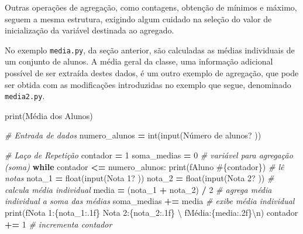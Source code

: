 \documentclass[
]{book}
\newenvironment{Shaded}{\begin{snugshade}}{\end{snugshade}}
\newcommand{\BuiltInTok}[1]{#1}
\newcommand{\CharTok}[1]{\textcolor[rgb]{0.31,0.60,0.02}{#1}}
\newcommand{\CommentTok}[1]{\textcolor[rgb]{0.56,0.35,0.01}{\textit{#1}}}
\newcommand{\ControlFlowTok}[1]{\textcolor[rgb]{0.13,0.29,0.53}{\textbf{#1}}}
\newcommand{\DecValTok}[1]{\textcolor[rgb]{0.00,0.00,0.81}{#1}}
\newcommand{\NormalTok}[1]{#1}
\newcommand{\OperatorTok}[1]{\textcolor[rgb]{0.81,0.36,0.00}{\textbf{#1}}}
\newcommand{\SpecialCharTok}[1]{\textcolor[rgb]{0.00,0.00,0.00}{#1}}
\newcommand{\SpecialStringTok}[1]{\textcolor[rgb]{0.31,0.60,0.02}{#1}}
\newcommand{\StringTok}[1]{\textcolor[rgb]{0.31,0.60,0.02}{#1}}
\begin{document}
Outras operações de agregação, como contagens, obtenção de mínimos e máximo, seguem a mesma estrutura, exigindo algum cuidado na seleção do valor de inicialização da variável destinada ao agregado.

No exemplo \texttt{media.py}, da seção anterior, são calculadas as médias individuais de um conjunto de alunos. A média geral da classe, uma informação adicional possível de ser extraída destes dados, é um outro exemplo de agregação, que pode ser obtida com as modificações introduzidas no exemplo que segue, denominado \texttt{media2.py}.

\begin{Shaded}
\begin{Highlighting}[]
\BuiltInTok{print}\NormalTok{(}\StringTok{\textquotesingle{}Média dos Alunos\textquotesingle{}}\NormalTok{)}

\CommentTok{\# Entrada de dados}
\NormalTok{numero\_alunos }\OperatorTok{=} \BuiltInTok{int}\NormalTok{(}\BuiltInTok{input}\NormalTok{(}\StringTok{\textquotesingle{}Número de alunos? \textquotesingle{}}\NormalTok{))}

\CommentTok{\# Laço de Repetição}
\NormalTok{contador }\OperatorTok{=} \DecValTok{1}
\NormalTok{soma\_medias }\OperatorTok{=} \DecValTok{0} \CommentTok{\# variável para agregação (soma)}
\ControlFlowTok{while}\NormalTok{ contador }\OperatorTok{\textless{}=}\NormalTok{ numero\_alunos:}
    \BuiltInTok{print}\NormalTok{(}\SpecialStringTok{f\textquotesingle{}Aluno \#}\SpecialCharTok{\{}\NormalTok{contador}\SpecialCharTok{\}}\SpecialStringTok{\textquotesingle{}}\NormalTok{)}
    \CommentTok{\# lê notas}
\NormalTok{    nota\_1 }\OperatorTok{=} \BuiltInTok{float}\NormalTok{(}\BuiltInTok{input}\NormalTok{(}\StringTok{\textquotesingle{}Nota 1? \textquotesingle{}}\NormalTok{))}
\NormalTok{    nota\_2 }\OperatorTok{=} \BuiltInTok{float}\NormalTok{(}\BuiltInTok{input}\NormalTok{(}\StringTok{\textquotesingle{}Nota 2? \textquotesingle{}}\NormalTok{))}
    \CommentTok{\# calcula média individual}
\NormalTok{    media }\OperatorTok{=}\NormalTok{ (nota\_1 }\OperatorTok{+}\NormalTok{ nota\_2) }\OperatorTok{/} \DecValTok{2}
    \CommentTok{\# agrega média individual a soma das médias}
\NormalTok{    soma\_medias }\OperatorTok{+=}\NormalTok{ media}
    \CommentTok{\# exibe média individual}
    \BuiltInTok{print}\NormalTok{(}\SpecialStringTok{f\textquotesingle{}Nota 1:}\SpecialCharTok{\{}\NormalTok{nota\_1}\SpecialCharTok{:.1f\}}\SpecialStringTok{  Nota 2:}\SpecialCharTok{\{}\NormalTok{nota\_2}\SpecialCharTok{:.1f\}}\SpecialStringTok{  \textquotesingle{}}\NormalTok{ \textbackslash{}}
        \SpecialStringTok{f\textquotesingle{}Média:}\SpecialCharTok{\{}\NormalTok{media}\SpecialCharTok{:.2f\}}\CharTok{\textbackslash{}n}\SpecialStringTok{\textquotesingle{}}\NormalTok{)}
\NormalTok{    contador }\OperatorTok{+=} \DecValTok{1} \CommentTok{\# incrementa contador}


\end{Highlighting}
\end{Shaded}
\end{document}
